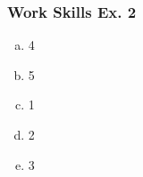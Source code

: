 \documentclass[12pt, a4paper, oneside]{article}
\begin{document}
  \subsubsection{Work Skills Ex. 2}
  \begin{enumerate}[a.]
    \item 4
    \item 5
    \item 1
    \item 2
    \item 3
  \end{enumerate}

  
\end{document}
